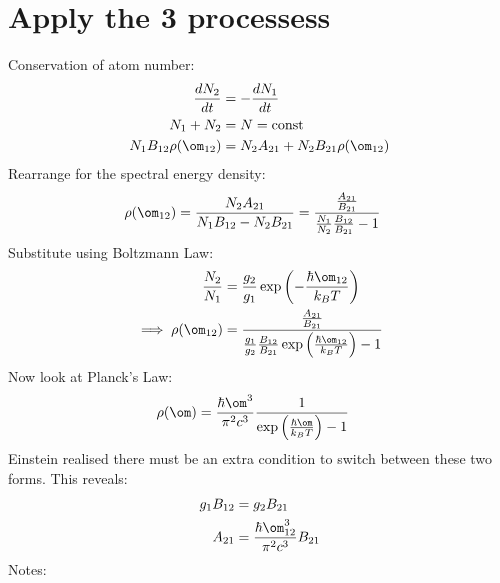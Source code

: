 \documentclass[a4paper, 11pt, normalem]{report}
\begin{document}
\section{Apply the 3 processess}
\begin{figure}[H]
    \centering
\end{figure}
Conservation of atom number:
\begin{align}
    \frac{dN_2}{dt} &= -\frac{dN_1}{dt} \\
    N_1 + N_2 &= N = \text{const} \\
    N_1B_{12}\rho(\om_{12}) &= N_2A_{21} + N_2B_{21}\rho(\om_{12})
\end{align}
Rearrange for the spectral energy density:
\begin{align}
    \rho(\om_{12}) &= \frac{N_2A_{21}}{N_1B_{12}-N_2B_{21}} = \frac{\frac{A_{21}}{B_{21}}}{\frac{N_1}{N_2}\frac{B_{12}}{B_{21}} - 1}
\end{align}
Substitute using Boltzmann Law:
\begin{align}
    \frac{N_2}{N_1} &= \frac{g_2}{g_1}\exp\left(-\frac{\hbar\om_{12}}{k_BT}\right) \\
    \implies \rho(\om_{12}) &= \frac{\frac{A_{21}}{B_{21}}}{\frac{g_1}{g_2}\frac{B_{12}}{B_{21}}\exp\left(\frac{\hbar\om_{12}}{k_BT}\right) - 1}
\end{align}
Now look at Planck's Law:
\begin{align}
    \rho(\om) &= \frac{\hbar\om^3}{\pi^2c^3} \frac{1}{\exp\left(\frac{\hbar\om}{k_BT}\right) - 1}
\end{align}
Einstein realised there must be an extra condition to switch between these two forms.
This reveals:
\begin{align}
    g_1B_{12} &= g_2B_{21} \\
    A_{21} &= \frac{\hbar\om_{12}^3}{\pi^2c^3}B_{21}
\end{align}
Notes:
\end{document}
